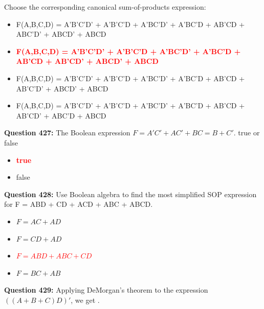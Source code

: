 \documentclass[12pt,a4paper]{article}
\begin{document}
Choose the corresponding canonical sum-of-products expression:

\begin{itemize}
    \item[\textbf{A.}] F(A,B,C,D) = A'B'C'D' + A'B'C'D + A'BC'D' + A'BC'D + AB'CD + ABC'D' + ABCD' + ABCD
    \item[\textbf{B.}] \textcolor{red}{\textbf{F(A,B,C,D) = A'B'C'D' + A'B'C'D + A'BC'D' + A'BC'D + AB'CD + AB'CD' + ABCD' + ABCD}}
    \item[\textbf{C.}] F(A,B,C,D) = A'B'C'D' + A'B'C'D + A'BC'D' + A'BC'D + AB'CD + AB'C'D' + ABCD' + ABCD
    \item[\textbf{D.}] F(A,B,C,D) = A'B'C'D' + A'B'C'D + A'BC'D' + A'BC'D + AB'CD + AB'CD' + ABC'D + ABCD
\end{itemize}

\vspace{0.5cm}

\textbf{Question 427:} The Boolean expression $F = A'C' + AC' + BC = B + C'$. true or false

\begin{itemize}
    \item[\textbf{A.}] \textcolor{red}{\textbf{true}}
    \item[\textbf{B.}] false
\end{itemize}

\vspace{0.5cm}

\vspace{0.5cm}

\textbf{Question 428:} Use Boolean algebra to find the most simplified SOP expression for F = ABD + CD + ACD + ABC + ABCD.

\begin{itemize}
    \item[\textbf{A.}] $F = AC + AD$
    \item[\textbf{B.}] $F = CD + AD$
    \item[\textbf{C.}] \textcolor{red}{\textbf{$F = ABD + ABC + CD$}}
    \item[\textbf{D.}] $F = BC + AB$
\end{itemize}

\vspace{0.5cm}

\vspace{0.5cm}

\textbf{Question 429:} Applying DeMorgan's theorem to the expression $((A + B + C)D)'$, we get \underline{\hspace{1.5cm}}.
\end{document}
